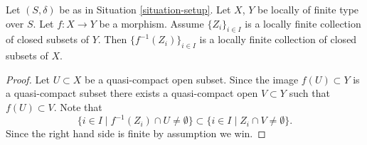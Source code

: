 \begin{lemma}
\label{lemma-inverse-image-locally-finite}
Let $(S, \delta)$ be as in Situation \ref{situation-setup}.
Let $X$, $Y$ be locally of finite type over $S$.
Let $f : X \to Y$ be a morphism.
Assume $\{Z_i\}_{i \in I}$ is a locally
finite collection of closed subsets of $Y$.
Then $\{f^{-1}(Z_i)\}_{i \in I}$ is a locally finite
collection of closed subsets of $X$.
\end{lemma}

\begin{proof}
Let $U \subset X$ be a quasi-compact open subset.
Since the image $f(U) \subset Y$ is a quasi-compact subset
there exists a quasi-compact open $V \subset Y$ such that
$f(U) \subset V$. Note that
$$
\{i \in I \mid f^{-1}(Z_i) \cap U \not = \emptyset \}
\subset
\{i \in I \mid Z_i \cap V \not = \emptyset \}.
$$
Since the right hand side is finite by assumption we win.
\end{proof}




